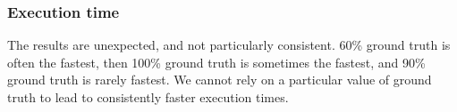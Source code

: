 \subsubsection{Execution time}
The results are unexpected, and not particularly consistent. 60\% ground truth is often the fastest, then 100\% ground truth is sometimes the fastest, and 90\% ground truth is rarely fastest.
We cannot rely on a particular value of ground truth to lead to consistently faster execution times.